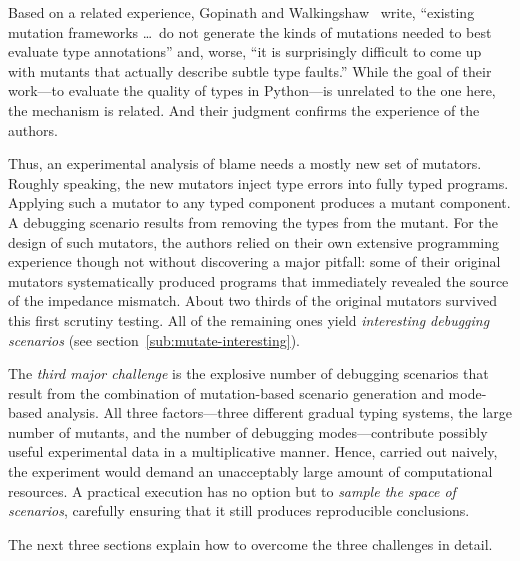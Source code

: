 Based on a related experience, Gopinath and Walkingshaw~\cite{gw-mutation} write,
``existing mutation frameworks \ldots\ do not generate the kinds of mutations
needed to best evaluate type annotations'' and, worse, ``it is surprisingly
difficult to come up with mutants that actually describe subtle type faults.''
While the goal of their work---to evaluate the quality of types in
Python---is unrelated to the one here, the mechanism is related. And their
judgment confirms the experience of the authors. 

Thus, an experimental analysis of blame needs a mostly new set of mutators.
Roughly speaking, the new mutators inject type errors into fully typed programs.
Applying such a mutator to any typed component produces a mutant component.  A
debugging scenario results from removing the types from the mutant. For the
design of such mutators, the authors relied on their own extensive programming
experience though not without discovering a major pitfall: some of their
original mutators systematically produced programs that immediately revealed the
source of the impedance mismatch. About two thirds of the original mutators
survived this first scrutiny testing. All of the remaining ones yield {\em
interesting debugging scenarios\/} (see section~\ref{sub:mutate-interesting}).

The {\em third major challenge\/} is the explosive number of debugging scenarios that
result from the combination of mutation-based scenario generation and mode-based
analysis. All three factors---three different gradual typing systems, the large
number of mutants, and the number of debugging modes---contribute possibly
useful experimental data in a multiplicative manner. Hence, carried out naively,
the experiment would demand an unacceptably large amount of computational
resources.  A practical execution has no option but to {\em sample the space of
scenarios\/}, carefully ensuring that it still produces reproducible
conclusions.

The next three sections explain how to overcome the three challenges
in detail. 
